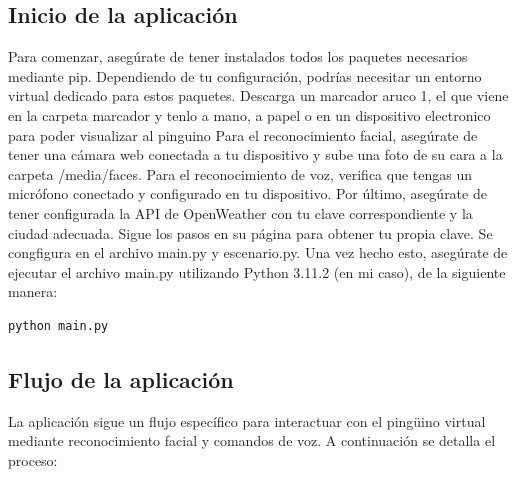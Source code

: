 \documentclass{article}
\begin{document}
\subsection{Inicio de la aplicación}
\vskip 0.1in
Para comenzar, asegúrate de tener instalados todos los paquetes necesarios mediante pip. Dependiendo de tu configuración, podrías necesitar un entorno virtual dedicado para estos paquetes. 
Descarga un marcador aruco 1, el que viene en la carpeta marcador y tenlo a mano, a papel o en un dispositivo electronico para poder visualizar al pinguino
Para el reconocimiento facial, asegúrate de tener una cámara web conectada a tu dispositivo y sube una foto de su cara a la carpeta /media/faces. Para el reconocimiento de voz, verifica que tengas un micrófono conectado y configurado en tu dispositivo. 
Por último, asegúrate de tener configurada la API de OpenWeather con tu clave correspondiente y la ciudad adecuada. Sigue los pasos en su página para obtener tu propia clave. Se congfigura en el archivo main.py y escenario.py.
\newline
Una vez hecho esto, asegúrate de ejecutar el archivo main.py utilizando Python 3.11.2 (en mi caso), de la siguiente manera:
\begin{verbatim}
python main.py
\end{verbatim}

\subsection{Flujo de la aplicación}

La aplicación sigue un flujo específico para interactuar con el pingüino virtual mediante reconocimiento facial y comandos de voz. A continuación se detalla el proceso:
\end{document}
